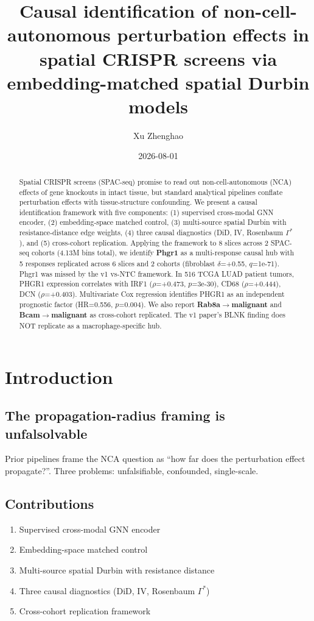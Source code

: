 \documentclass[11pt]{article}
\title{\textbf{Causal identification of non-cell-autonomous perturbation effects in spatial CRISPR screens via embedding-matched spatial Durbin models}}
\author{Xu Zhenghao}
\date{2026-08-01}
\begin{document}
\maketitle

\begin{abstract}
Spatial CRISPR screens (SPAC-seq) promise to read out non-cell-autonomous (NCA) effects of gene knockouts in intact tissue, but standard analytical pipelines conflate perturbation effects with tissue-structure confounding. We present a causal identification framework with five components: (1) supervised cross-modal GNN encoder, (2) embedding-space matched control, (3) multi-source spatial Durbin with resistance-distance edge weights, (4) three causal diagnostics (DiD, IV, Rosenbaum $\Gamma^*$), and (5) cross-cohort replication. Applying the framework to 8 slices across 2 SPAC-seq cohorts (4.13M bins total), we identify \textbf{Phgr1} as a multi-response causal hub with 5 responses replicated across 6 slices and 2 cohorts (fibroblast $\delta$=+0.55, $q$=1e-71). Phgr1 was missed by the v1 vs-NTC framework. In 516 TCGA LUAD patient tumors, PHGR1 expression correlates with IRF1 ($\rho$=+0.473, $p$=3e-30), CD68 ($\rho$=+0.444), DCN ($\rho$=+0.403). Multivariate Cox regression identifies PHGR1 as an independent prognostic factor (HR=0.556, $p$=0.004). We also report \textbf{Rab8a$\to$malignant} and \textbf{Bcam$\to$malignant} as cross-cohort replicated. The v1 paper's BLNK finding does NOT replicate as a macrophage-specific hub.
\end{abstract}

\section{Introduction}

\subsection{The propagation-radius framing is unfalsolvable}

Prior pipelines frame the NCA question as ``how far does the perturbation effect propagate?''. Three problems: unfalsifiable, confounded, single-scale.

\subsection{Contributions}

\begin{enumerate}
\item Supervised cross-modal GNN encoder
\item Embedding-space matched control
\item Multi-source spatial Durbin with resistance distance
\item Three causal diagnostics (DiD, IV, Rosenbaum $\Gamma^*$)
\item Cross-cohort replication framework
\end{enumerate}
\end{document}
